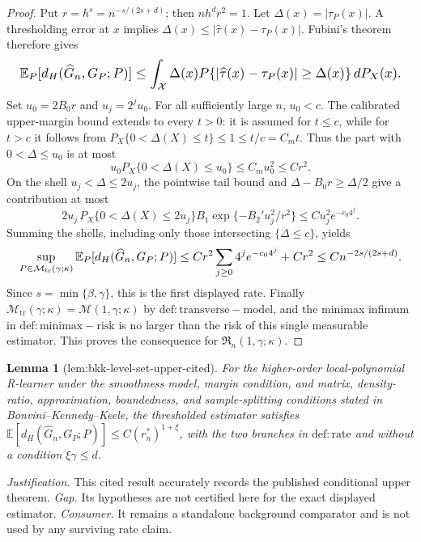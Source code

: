 \documentclass{article}
\newtheorem{lemma}{Lemma}
\begin{document}
\begin{proof}
Put \(r=h^s=n^{-s/(2s+d)}\); then \(nh^dr^2=1\). Let \(\Delta(x)=|\tau_P(x)|\). A thresholding error at \(x\) implies \(\Delta(x)\le|\widehat\tau(x)-\tau_P(x)|\). Fubini's theorem therefore gives
\[
\makebox[\linewidth][c]{\resizebox{0.98\linewidth}{!}{\(\displaystyle \mathbb E_P[d_H(\widehat G_n,G_P;P)]
\le\int_{\mathcal X}\Delta(x)
P\{|\widehat\tau(x)-\tau_P(x)|\ge\Delta(x)\}\,dP_X(x).\)}}
\]
Set \(u_0=2B_0r\) and \(u_j=2^ju_0\). For all sufficiently large \(n\), \(u_0<c\). The calibrated upper-margin bound extends to every \(t>0\): it is assumed for \(t\le c\), while for \(t>c\) it follows from \(P_X\{0<\Delta(X)\le t\}\le1\le t/c=C_mt\). Thus the part with \(0<\Delta\le u_0\) is at most
\[
u_0P_X\{0<\Delta(X)\le u_0\}\le C_m u_0^2\le Cr^2.
\]
On the shell \(u_j<\Delta\le2u_j\), the pointwise tail bound and \(\Delta-B_0r\ge\Delta/2\) give a contribution at most
\[
2u_j\,P_X\{0<\Delta(X)\le2u_j\}
B_1\exp\{-B_2' u_j^2/r^2\}
\le C u_j^2e^{-c_0 4^j}.
\]
Summing the shells, including only those intersecting \(\{\Delta\le c\}\), yields
\[
\makebox[\linewidth][c]{\resizebox{0.98\linewidth}{!}{\(\displaystyle \sup_{P\in\mathcal M_{\mathrm{tr}}(\gamma;\kappa)}
\mathbb E_P[d_H(\widehat G_n,G_P;P)]
\le Cr^2\sum_{j\ge0}4^je^{-c_0 4^j}+Cr^2
\le Cn^{-2s/(2s+d)}.\)}}
\]
Since \(s=\min\{\beta,\gamma\}\), this is the first displayed rate. Finally \(\mathcal M_{\mathrm{tr}}(\gamma;\kappa)=\mathcal M(1,\gamma;\kappa)\) by \(\mathrm{def:transverse-model}\), and the minimax infimum in \(\mathrm{def:minimax-risk}\) is no larger than the risk of this single measurable estimator. This proves the consequence for \(\mathfrak R_n(1,\gamma;\kappa)\).
\end{proof}

\begin{lemma}[lem:bkk-level-set-upper-cited]\label{lem:bkk-level-set-upper-cited}
For the higher-order local-polynomial R-learner under the smoothness model, margin condition, and matrix, density-ratio, approximation, boundedness, and sample-splitting conditions stated in Bonvini--Kennedy--Keele, the thresholded estimator satisfies \(\mathbb E[d_H(\widehat G_n,G_P;P)]\le C(r_n^*)^{1+\xi}\), with the two branches in \(\mathrm{def:rate}\) and without a condition \(\xi\gamma\le d\).
\end{lemma}
\par\smallskip\noindent \textit{Justification.} This cited result accurately records the published conditional upper theorem. \textit{Gap.} Its hypotheses are not certified here for the exact displayed estimator. \textit{Consumer.} It remains a standalone background comparator and is not used by any surviving rate claim.
\end{document}
